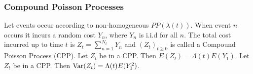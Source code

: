 \subsubsection*{Compound Poisson Processes}
 Let events occur according to non-homogeneous $PP(\lambda(t))$. When event $n$ occurs it incurs a random cost $Y_n$, where $Y_n$ is i.i.d for all $n$. The total cost incurred up to time $t$ is 
$Z_t = \sum^{N_t}_{n=1} Y_n$ 
and $(Z_t)_{t \ge 0}$ is called a Compound Poisson Process (CPP).
 Let $Z_t$ be in a CPP. Then 
$E(Z_t) = \Lambda(t)E(Y_1)$.
 Let $Z_t$ be in a CPP. Then 
$\operatorname{Var}(Z_t) = \Lambda(t)E(Y^2_1)$.